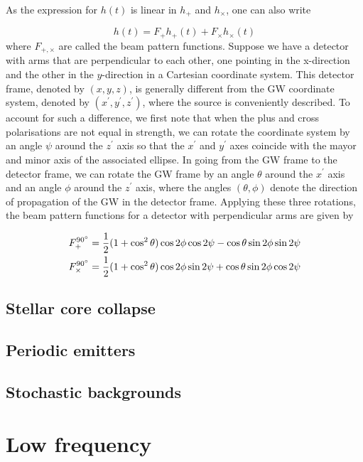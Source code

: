 \documentclass[binding=0.6cm, LaM]{sapthesis}
\begin{document}
As the expression for $h(t)$ is linear in $h_{+}$ and $h_{\times}$, one can also write

\begin{equation}
h(t) = F_{+}h_{+} (t) + F_{\times}h_{\times}(t)
\end{equation}
where $F_{+,\times}$ are called the beam pattern functions. Suppose we have a detector with arms that are perpendicular to each other, one pointing in the x-direction and the other in the $y$-direction in a Cartesian coordinate system. This detector frame, denoted by $(x,y,z)$, is generally different from the GW coordinate system, denoted by $(x^\prime,y^\prime,z^\prime)$, where the source is conveniently described. To account for such a difference, we first note that when the plus and cross polarisations are not equal in strength, we can rotate the coordinate system by an angle $\psi$ around the $z^\prime$ axis so that the $x^\prime$ and $y^\prime$ axes coincide with the mayor and minor axis of the associated ellipse. In going from the GW frame to the detector frame, we can rotate the GW frame by an angle $\theta$ around the $x^\prime$ axis and an angle $\phi$ around the $z^\prime$ axis, where the angles $(\theta, \phi)$ denote the direction of propagation of the GW in the detector frame. Applying these three rotations, the beam pattern functions for a detector with perpendicular arms are given by 

\begin{align}
F_{+}^{\ang{90}}& = {1 \over 2} (1 + \cos^2 \theta)\cos 2\phi \cos 2 \psi - \cos \theta \sin2\phi \sin2\psi \\
F_{\times}^{\ang{90}}& = {1 \over 2} (1 + \cos^2 \theta)\cos 2\phi \sin 2 \psi + \cos \theta \sin2\phi \cos2\psi
\end{align}




\subsection{Stellar core collapse}

\subsection{Periodic emitters}

\subsection{Stochastic backgrounds}
\section{Low frequency}
\backmatter
\cleardoublepage


\begin{thebibliography}{100}
\end{thebibliography}
\end{document}
